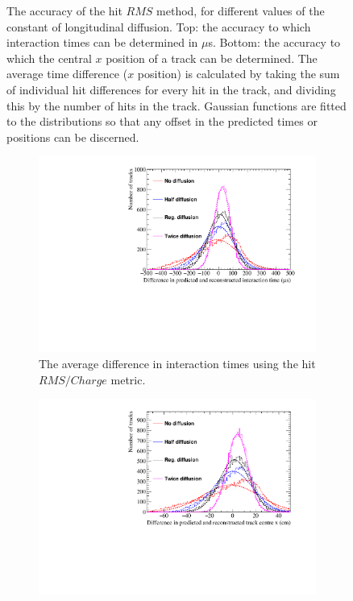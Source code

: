 \begin{figure}
  \caption[Comparing the accuracy of the hit $RMS$ method, as the constant of longitudinal diffusion changes]
          {The accuracy of the hit $RMS$ method, for different values of the constant of longitudinal diffusion. Top: the accuracy to which interaction times can be determined in $\mu$s. Bottom: the accuracy to which the central $x$ position of a track can be determined. The average time difference ($x$ position) is calculated by taking the sum of individual hit differences for every hit in the track, and dividing this by the number of hits in the track. Gaussian functions are fitted to the distributions so that any offset in the predicted times or positions can be discerned.}
  \label{fig:DiffLDiff_AvDiff_RMS}
\end{figure}

\begin{figure}
  \centering
  \begin{subfigure}{0.6\textwidth}
    \centering
    \includegraphics[width=\textwidth]{Canvas_AvDiff_T_RMS_Q_Diffusion}
    \caption{The average difference in interaction times using the hit $RMS/Charge$ metric.}
    \label{fig:DiffLDiff_AvDiff_RMS_Int_T}
  \end{subfigure}
  \begin{subfigure}{0.6\textwidth}
    \centering
    \includegraphics[width=\textwidth]{Canvas_AvDiff_X_RMS_Q_Diffusion}

\end{subfigure}
\end{figure}
